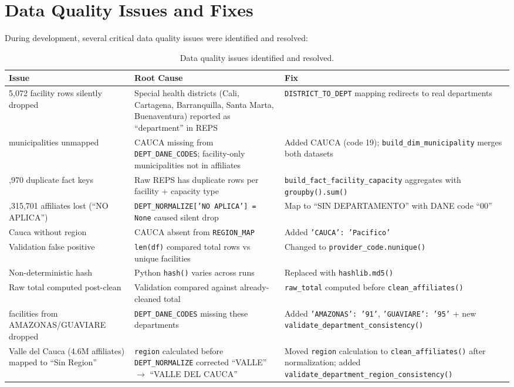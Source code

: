 \documentclass[12pt,a4paper]{article}
\begin{document}
\section{Data Quality Issues and Fixes}

During development, several critical data quality issues were identified and resolved:

\begin{table}[H]
\centering
\small
\begin{tabularx}{\textwidth}{p{4.5cm} X X}
\toprule
\textbf{Issue} & \textbf{Root Cause} & \textbf{Fix}\\
\midrule
5,072 facility rows silently dropped & Special health districts (Cali, Cartagena, Barranquilla, Santa Marta, Buenaventura) reported as ``department'' in REPS & \texttt{DISTRICT\_TO\_DEPT} mapping redirects to real departments\\
\addlinespace
80 municipalities unmapped & CAUCA missing from \texttt{DEPT\_DANE\_CODES}; facility-only municipalities not in affiliates & Added CAUCA (code 19); \texttt{build\_dim\_municipality} merges both datasets\\
\addlinespace
13,970 duplicate fact keys & Raw REPS has duplicate rows per facility + capacity type & \texttt{build\_fact\_facility\_capacity} aggregates with \texttt{groupby().sum()}\\
\addlinespace
1,315,701 affiliates lost (``NO APLICA'') & \texttt{DEPT\_NORMALIZE['NO APLICA'] = None} caused silent drop & Map to ``SIN DEPARTAMENTO'' with DANE code ``00''\\
\addlinespace
Cauca without region & CAUCA absent from \texttt{REGION\_MAP} & Added \texttt{'CAUCA': 'Pacifico'}\\
\addlinespace
Validation false positive & \texttt{len(df)} compared total rows vs unique facilities & Changed to \texttt{provider\_code.nunique()}\\
\addlinespace
Non-deterministic hash & Python \texttt{hash()} varies across runs & Replaced with \texttt{hashlib.md5()}\\
\addlinespace
Raw total computed post-clean & Validation compared against already-cleaned total & \texttt{raw\_total} computed before \texttt{clean\_affiliates()}\\
\addlinespace
29 facilities from AMAZONAS/GUAVIARE dropped & \texttt{DEPT\_DANE\_CODES} missing these departments & Added \texttt{'AMAZONAS': '91'}, \texttt{'GUAVIARE': '95'} + new \texttt{validate\_department\_consistency()}\\
\addlinespace
Valle del Cauca (4.6M affiliates) mapped to ``Sin Region'' & \texttt{region} calculated before \texttt{DEPT\_NORMALIZE} corrected ``VALLE'' $\to$ ``VALLE DEL CAUCA'' & Moved \texttt{region} calculation to \texttt{clean\_affiliates()} after normalization; added \texttt{validate\_department\_region\_consistency()}\\
\bottomrule
\end{tabularx}
\caption{Data quality issues identified and resolved.}
\end{table}
\end{document}
